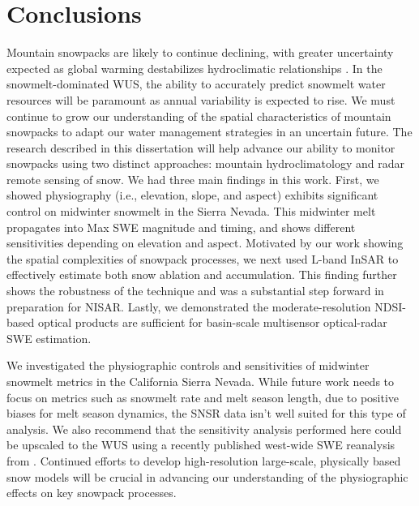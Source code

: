 
\hypertarget{ch5}{\chapter{Conclusions}\label{ch5}}

Mountain snowpacks are likely to continue declining, with greater uncertainty expected as global warming destabilizes hydroclimatic relationships \citep{millyStationarityDeadWhither2008}. In the snowmelt-dominated WUS, the ability to accurately predict snowmelt water resources will be paramount as annual variability is expected to rise. We must continue to grow our understanding of the spatial characteristics of mountain snowpacks to adapt our water management strategies in an uncertain future. The research described in this dissertation will help advance our ability to monitor snowpacks using two distinct approaches: mountain hydroclimatology and radar remote sensing of snow. We had three main findings in this work. First, we showed physiography (i.e., elevation, slope, and aspect) exhibits significant control on midwinter snowmelt in the Sierra Nevada. This midwinter melt propagates into Max SWE magnitude and timing, and shows different sensitivities depending on elevation and aspect. Motivated by our work showing the spatial complexities of snowpack processes, we next used L-band InSAR to effectively estimate both snow ablation and accumulation. This finding further shows the robustness of the technique and was a substantial step forward in preparation for NISAR. Lastly, we demonstrated the moderate-resolution NDSI-based optical products are sufficient for basin-scale multisensor optical-radar SWE estimation. 

We investigated the physiographic controls and sensitivities of midwinter snowmelt metrics in the California Sierra Nevada. While future work needs to focus on metrics such as snowmelt rate and melt season length, due to positive biases for melt season dynamics, the SNSR data isn't well suited for this type of analysis. We also recommend that the sensitivity analysis performed here could be upscaled to the WUS using a recently published west-wide SWE reanalysis from \cite{fangWesternUnitedStates2022}. Continued efforts to develop high-resolution large-scale, physically based snow models will be crucial in advancing our understanding of the physiographic effects on key snowpack processes.


